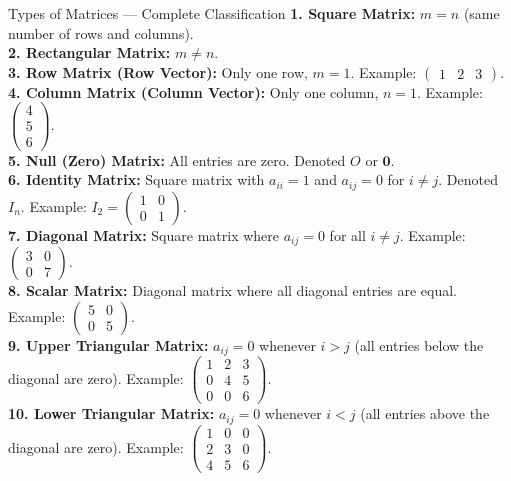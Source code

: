 \documentclass[12pt,a4paper]{article}
\begin{document}
\begin{infobox}{Types of Matrices --- Complete Classification}
\textbf{1. Square Matrix:} $m = n$ (same number of rows and columns). \\[2pt]
\textbf{2. Rectangular Matrix:} $m \neq n$. \\[2pt]
\textbf{3. Row Matrix (Row Vector):} Only one row, $m = 1$. Example: $\begin{pmatrix} 1 & 2 & 3 \end{pmatrix}$. \\[2pt]
\textbf{4. Column Matrix (Column Vector):} Only one column, $n = 1$. Example: $\begin{pmatrix} 4 \\ 5 \\ 6 \end{pmatrix}$. \\[2pt]
\textbf{5. Null (Zero) Matrix:} All entries are zero. Denoted $O$ or $\mathbf{0}$. \\[2pt]
\textbf{6. Identity Matrix:} Square matrix with $a_{ii} = 1$ and $a_{ij} = 0$ for $i \neq j$. Denoted $I_n$. Example: $I_2 = \begin{pmatrix} 1 & 0 \\ 0 & 1 \end{pmatrix}$. \\[2pt]
\textbf{7. Diagonal Matrix:} Square matrix where $a_{ij} = 0$ for all $i \neq j$. Example: $\begin{pmatrix} 3 & 0 \\ 0 & 7 \end{pmatrix}$. \\[2pt]
\textbf{8. Scalar Matrix:} Diagonal matrix where all diagonal entries are equal. Example: $\begin{pmatrix} 5 & 0 \\ 0 & 5 \end{pmatrix}$. \\[2pt]
\textbf{9. Upper Triangular Matrix:} $a_{ij} = 0$ whenever $i > j$ (all entries below the diagonal are zero). Example: $\begin{pmatrix} 1 & 2 & 3 \\ 0 & 4 & 5 \\ 0 & 0 & 6 \end{pmatrix}$. \\[2pt]
\textbf{10. Lower Triangular Matrix:} $a_{ij} = 0$ whenever $i < j$ (all entries above the diagonal are zero). Example: $\begin{pmatrix} 1 & 0 & 0 \\ 2 & 3 & 0 \\ 4 & 5 & 6 \end{pmatrix}$. \\[2pt]

\end{infobox}
\end{document}
